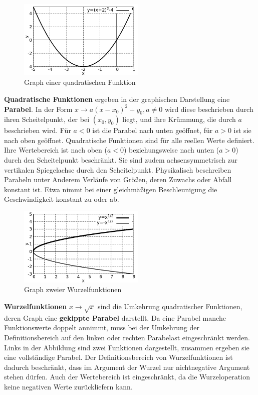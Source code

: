 \begin{minipage}[t]{1\textwidth}
    \begin{figure}
        \centering
        \includegraphics[width=6cm]{./gnuplot/base-function-quadratic}
        \caption{Graph einer quadratischen Funktion}
        \label{fig:ExBaseFunQuad}
    \end{figure}
    \textbf{Quadratische Funktionen} ergeben in der graphischen Darstellung eine \textbf{Parabel}. In der Form $x \to a(x-x_0)^2+y_0, a\ne 0$ wird diese beschrieben durch ihren Scheitelpunkt, der bei $(x_0,y_0)$ liegt, und ihre Krümmung, die durch $a$ beschrieben wird. Für $a<0$ ist die Parabel nach unten geöffnet, für $a>0$ ist sie nach oben geöffnet. Quadratische Funktionen sind für alle reellen Werte definiert. Ihre Wertebereich ist nach oben ($a<0$) beziehungsweise nach unten ($a>0$) durch den Scheitelpunkt beschränkt. Sie sind zudem achsensymmetrisch zur vertikalen Spiegelachse durch den Scheitelpunkt. Physikalisch beschreiben Parabeln unter Anderem Verläufe von Größen, deren Zuwachs oder Abfall konstant ist. Etwa nimmt bei einer gleichmäßigen Beschleunigung die Geschwindigkeit konstant zu oder ab.
\end{minipage}

\begin{minipage}[t]{1\textwidth}
    \begin{figure}
        \centering
        \includegraphics[width=6cm]{./gnuplot/base-function-root}
        \caption{Graph zweier Wurzelfunktionen}
        \label{fig:ExBaseFunRoot}
    \end{figure}
    \textbf{Wurzelfunktionen} $x \to \sqrt{x}$ sind die Umkehrung quadratischer Funktionen, deren Graph eine \textbf{gekippte Parabel} darstellt. Da eine Parabel manche Funktionswerte doppelt annimmt, muss bei der Umkehrung der Definitionsbereich auf den linken oder rechten Parabelast eingeschränkt werden. Links in der Abbildung sind zwei Funktionen dargestellt, zusammen ergeben sie eine vollständige Parabel. Der Definitionsbereich von Wurzelfunktionen ist dadurch beschränkt, dass im Argument der Wurzel nur nichtnegative Argument stehen dürfen. Auch der Wertebereich ist eingeschränkt, da die Wurzeloperation keine negativen Werte zurückliefern kann.
\end{minipage}

